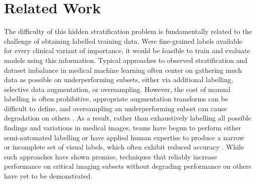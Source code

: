 \documentclass{article}
\begin{document}
\section{Related Work}

The difficulty of this hidden stratification problem is fundamentally related to the challenge of obtaining labelled training data.  
Were fine-grained labels available for every clinical variant of importance, it would be feasible to train and evaluate models using this information.  
Typical approaches to observed stratification and dataset imbalance in medical machine learning often center on gathering much data as possible on underperforming subsets, either via additional labelling, selective data augmentation, or oversampling\citep{Mazurowski2008-cq}.  
However, the cost of manual labelling is often prohibitive, appropriate augmentation transforms can be difficult to define, and oversampling an underperforming subset can cause degradation on others \citep{Fries2019-ze, Ratner2017-td,Agniel2018-qp, Buda2018-ab, Zech2018-xq}.  
As a result, rather than exhaustively labelling all possible findings and variations in medical images, teams have begun to perform either semi-automated labelling \citep{Wang2017-vm, Fries2019-ze, Irvin2019-ho, Chilamkurthy2018-op, Dunnmon2019-zw, Fries2019-ze}  or have applied human expertise to produce a narrow or incomplete set of visual labels, which often exhibit reduced accuracy \citep{Oakden-Rayner2019-yi}.  
While such approaches have shown promise, techniques that reliably increase performance on critical imaging subsets without degrading performance on others have yet to be demonstrated.
 
\end{document}
